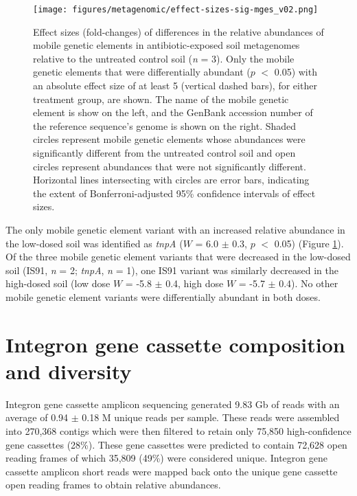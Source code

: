\begin{figure}[htpb]
	\centering
		\texttt{[image: figures/metagenomic/effect-sizes-sig-mges\_v02.png]}
	\caption[Effect sizes of differentially abundant metagenomic mobile genetic elements.]{
		Effect sizes (fold-changes) of differences in the relative abundances of mobile genetic elements in antibiotic-exposed soil metagenomes relative to the untreated control soil (\textit{n} = 3).
		Only the mobile genetic elements that were differentially abundant ($p$ $<$ 0.05) with an absolute effect size of at least 5 (vertical dashed bars), for either treatment group, are shown.
		The name of the mobile genetic element is show on the left, and the GenBank accession number of the reference sequence's genome is shown on the right.
		Shaded circles represent mobile genetic elements whose abundances were significantly different from the untreated control soil and open circles represent abundances that were not significantly different.
		Horizontal lines intersecting with circles are error bars, indicating the extent of Bonferroni-adjusted 95\% confidence intervals of effect sizes.
	}
	\label{fig:effect-sizes-sig-mges}
\end{figure}

The only mobile genetic element variant with an increased relative abundance in the low-dosed soil was identified as \textit{tnpA} ($W$ = 6.0 $\pm$ 0.3, $p$ $<$ 0.05) (Figure \ref{fig:effect-sizes-sig-mges}).
Of the three mobile genetic element variants that were decreased in the low-dosed soil (IS91, \textit{n} = 2; \textit{tnpA}, \textit{n} = 1), one IS91 variant was similarly decreased in the high-dosed soil (low dose $W$ = -5.8 $\pm$ 0.4, high dose $W$ = -5.7 $\pm$ 0.4).
No other mobile genetic element variants were differentially abundant in both doses.

\section{Integron gene cassette composition and diversity}

Integron gene cassette amplicon sequencing generated 9.83 Gb of reads with an average of 0.94 $\pm$ 0.18 M unique reads per sample.
These reads were assembled into 270,368 contigs which were then filtered to retain only 75,850 high-confidence gene cassettes (28\%).
These gene cassettes were predicted to contain 72,628 open reading frames of which 35,809 (49\%) were considered unique.
Integron gene cassette amplicon short reads were mapped back onto the unique gene cassette open reading frames to obtain relative abundances.

